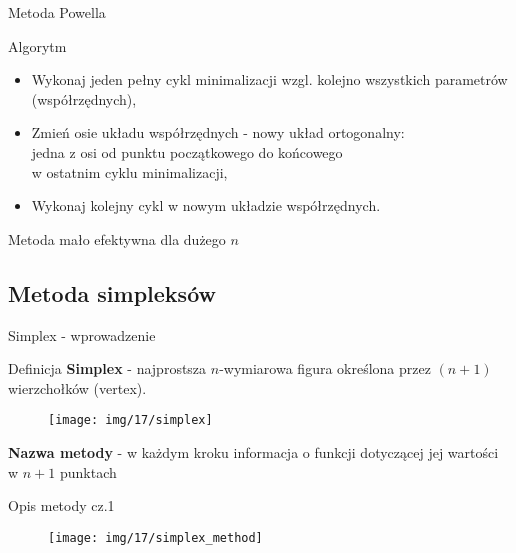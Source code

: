   \begin{frame}{Metoda Powella}

    \begin{block}{Algorytm}
 	  \begin{itemize}
   		\item Wykonaj jeden pełny cykl minimalizacji wzgl. kolejno wszystkich parametrów (współrzędnych),
   		\item Zmień osie układu współrzędnych - nowy układ ortogonalny:
   		\\jedna z osi od punktu początkowego do końcowego
   		\\w ostatnim cyklu minimalizacji,
   		\item Wykonaj kolejny cykl w nowym układzie współrzędnych.
  	\end{itemize}
  	\end{block}
  	  Metoda mało efektywna dla dużego $n$

  \end{frame}

\subsection{Metoda simpleksów}

  \begin{frame}{Simplex - wprowadzenie}

    \begin{block}{Definicja}
 	  \textbf{Simplex} - najprostsza $n$-wymiarowa figura określona przez $(n+1)$ wierzchołków (vertex).
  	\end{block}
  	\begin{figure}
		\centering
		\texttt{[image: img/17/simplex]}
	\end{figure}
  	\begin{block}{}
 	  \textbf{Nazwa metody} - w każdym kroku informacja o funkcji dotyczącej jej wartości w $n+1$ punktach
  	\end{block}

  \end{frame}

  \begin{frame}{Opis metody cz.1}

  	\begin{figure}
		\centering
		\texttt{[image: img/17/simplex\_method]}
	\end{figure}

  \end{frame}


